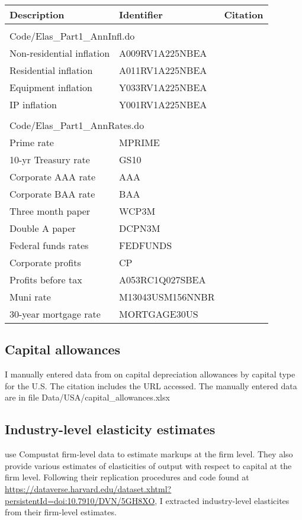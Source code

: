 \documentclass[11pt]{article}
\begin{document}
\begin{longtable}{p{2in}p{1.5in}p{2.5in}}
Description & Identifier & Citation \\
\midrule
\\
\multicolumn{3}{l}{Code/Elas\_Part1\_AnnInfl.do} \\ \midrule
Non-residential inflation & A009RV1A225NBEA &  \cite{fedint}\\
Residential inflation & A011RV1A225NBEA & \cite{fedint}\\
Equipment inflation & Y033RV1A225NBEA  &  \cite{fedint}\\
IP inflation & Y001RV1A225NBEA  &  \cite{fedint} \\
\\
\multicolumn{3}{l}{Code/Elas\_Part1\_AnnRates.do} \\ \midrule
Prime rate & MPRIME &  \cite{fedint}\\
10-yr Treasury rate & GS10 & \cite{fedint}\\
Corporate AAA rate & AAA  &  \cite{moodys}\\
Corporate BAA rate & BAA  &  \cite{moodys} \\
Three month paper & WCP3M  &  \cite{moodys} \\
Double A paper & DCPN3M  &  \cite{moodys} \\
Federal funds rates & FEDFUNDS  &  \cite{fedint} \\
Corporate profits &  CP & \cite{beaimap} \\
Profits before tax &  A053RC1Q027SBEA & \cite{beaimap} \\
Muni rate &  M13043USM156NNBR & \cite{moodys} \\
30-year mortgage rate &  MORTGAGE30US & \cite{moodys} \\
\end{longtable}

\subsection{Capital allowances}
I manually entered data from \cite{taxallow} on capital depreciation allowances by capital type for the U.S. The citation includes the URL accessed. The manually entered data are in file Data/USA/capital\_allowances.xlsx

\subsection{Industry-level elasticity estimates}
\cite{dleu2020} use Compustat firm-level data to estimate markups at the firm level. They also provide various estimates of elasticities of output with respect to capital at the firm level. Following their replication procedures and code found at \url{https://dataverse.harvard.edu/dataset.xhtml?persistentId=doi:10.7910/DVN/5GH8XO}, I extracted industry-level elasticites from their firm-level estimates. 
\end{document}
